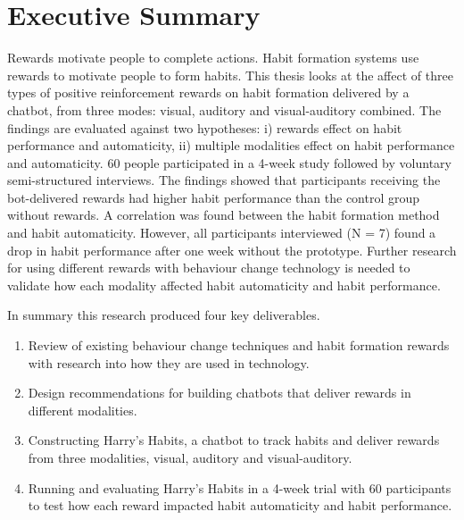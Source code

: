 
\section*{Executive Summary}
Rewards motivate people to complete actions. Habit formation systems use rewards to motivate people to form habits. This thesis looks at the affect of three types of positive reinforcement rewards on habit formation delivered by a chatbot, from three modes: visual, auditory and visual-auditory combined. The findings are evaluated against two hypotheses: i) rewards effect on habit performance and automaticity, ii) multiple modalities effect on habit performance and automaticity. 60 people participated in a 4-week study followed by voluntary semi-structured interviews. The findings showed that participants receiving the bot-delivered rewards had higher habit performance than the control group without rewards. A correlation was found between the habit formation method and habit automaticity. However, all participants interviewed (N = 7) found a drop in habit performance after one week without the prototype. Further research for using different rewards with behaviour change technology is needed to validate how each modality affected habit automaticity and habit performance.

In summary this research produced four key deliverables.

\begin{enumerate}
  \item Review of existing behaviour change techniques and habit formation rewards with research into how they are used in technology.
  \item Design recommendations for building chatbots that deliver rewards in different modalities.
  \item Constructing Harry's Habits, a chatbot to track habits and deliver rewards from three modalities, visual, auditory and visual-auditory.
  \item Running and evaluating Harry's Habits in a 4-week trial with 60 participants to test how each reward impacted habit automaticity and habit performance.
\end{enumerate}

\newpage



